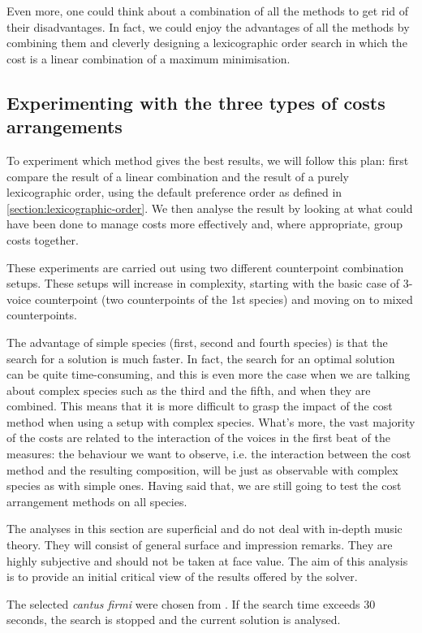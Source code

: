 Even more, one could think about a combination of all the methods to get rid of their disadvantages. In fact, we could enjoy the advantages of all the methods by combining them and cleverly designing a lexicographic order search in which the cost is a linear combination of a maximum minimisation.

\subsection{Experimenting with the three types of costs arrangements}
To experiment which method gives the best results, we will follow this plan: first compare the result of a linear combination and the result of a purely lexicographic order, using the default preference order as defined in \ref{section:lexicographic-order}. We then analyse the result by looking at what could have been done to manage costs more effectively and, where appropriate, group costs together.


These experiments are carried out using two different counterpoint combination setups. These setups will increase in complexity, starting with the basic case of 3-voice counterpoint (two counterpoints of the 1st species) and moving on to mixed counterpoints. 

The advantage of simple species (first, second and fourth species) is that the search for a solution is much faster. In fact, the search for an optimal solution can be quite time-consuming, and this is even more the case when we are talking about complex species such as the third and the fifth, and when they are combined. This means that it is more difficult to grasp the impact of the cost method when using a setup with complex species. What's more, the vast majority of the costs are related to the interaction of the voices in the first beat of the measures: the behaviour we want to observe, i.e. the interaction between the cost method and the resulting composition, will be just as observable with complex species as with simple ones. Having said that, we are still going to test the cost arrangement methods on all species.

The analyses in this section are superficial and do not deal with in-depth music theory. They will consist of general surface and impression remarks. They are highly subjective and should not be taken at face value. The aim of this analysis is to provide an initial critical view of the results offered by the solver.

The selected \textit{cantus firmi} were chosen from \gap. If the search time exceeds 30 seconds, the search is stopped and the current solution is analysed.
